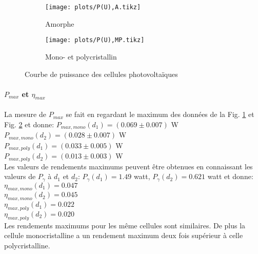 \begin{figure}
    \centering
    \begin{subfigure}[c]{0.4\linewidth}
        \centering
        \texttt{[image: plots/P(U),A.tikz]}
        \caption{Amorphe}
        \label{plot:3a}        
    \end{subfigure}
    \begin{subfigure}[c]{0.4\linewidth}
        \centering
        \texttt{[image: plots/P(U),MP.tikz]}
        \caption{Mono- et polycristallin}
        \label{plot:3b}        
    \end{subfigure}
    \caption{Courbe de puissance des cellules photovoltaïques}
    \label{plot:3}
\end{figure}

\paragraph*{\(P_{max}\) et \(\eta_{max}\)}
La mesure de \(P_{max}\) se fait en regardant le maximum des données de la Fig. \ref{plot:3a} et Fig. \ref{plot:3b} et donne: 
\(P_{max,mono} (d_1) =  (0.069 \pm 0.007)\) \unit{\watt} \\
\(P_{max,mono} (d_2) =  (0.028 \pm 0.007)\) \unit{\watt} \\
\(P_{max,poly} (d_1) =  (0.033 \pm 0.005)\) \unit{\watt} \\
\(P_{max,poly} (d_2) =  (0.013 \pm 0.003)\) \unit{\watt} \\
Les valeurs de rendements maximums peuvent être obtenues en connaissant les valeurs de \(P_\gamma\) à \(d_1\) et \(d_2\): \(P_\gamma (d_1) = 1.49\) \unit{watt}, \(P_\gamma (d_2) = 0.621\) \unit{watt} et donne:
\(\eta_{max,mono} (d_1) =  0.047\) \\
\(\eta_{max,mono} (d_2) =  0.045\) \\
\(\eta_{max,poly} (d_1) =  0.022\) \\
\(\eta_{max,poly} (d_2) =  0.020\) \\
Les rendements maximums pour les même cellules sont similaires. De plus la cellule monocristalline a un rendement maximum deux fois supérieur à celle polycristalline.

